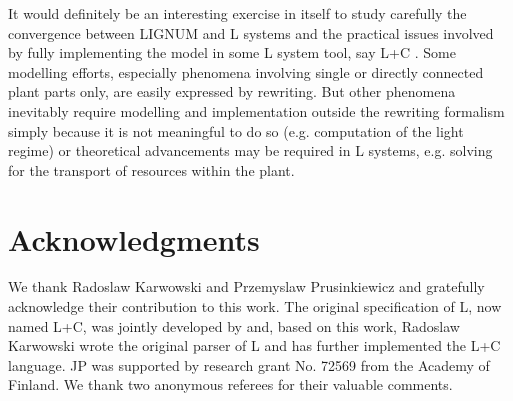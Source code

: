 It  would definitely  be an  interesting exercise  in itself  to study
carefully  the  convergence  between  LIGNUM  and L  systems  and  the
practical issues  involved by fully  implementing the model in  some L
system  tool, say L+C  \citep{karwowski:02}.  Some  modelling efforts,
especially  phenomena  involving single  or  directly connected  plant
parts only,  are easily expressed  by rewriting.  But  other phenomena
inevitably require modelling  and implementation outside the rewriting
formalism  simply  because  it  is  not  meaningful  to  do  so  (e.g.
computation of  the light regime)  or theoretical advancements  may be
required in  L systems, e.g.   solving for the transport  of resources
within the plant.

\section{Acknowledgments}

We   thank  Radoslaw  Karwowski   and  Przemyslaw   Prusinkiewicz  and
gratefully acknowledge their contribution  to this work.  The original
specification  of   L,  now  named  L+C,  was   jointly  developed  by
\citet{pp:99a} and,  based on this work, Radoslaw  Karwowski wrote the
original parser of L and  has further implemented the L+C language. JP
was supported by research grant No. 72569 from the Academy of Finland.
We thank two anonymous referees for their valuable comments.
